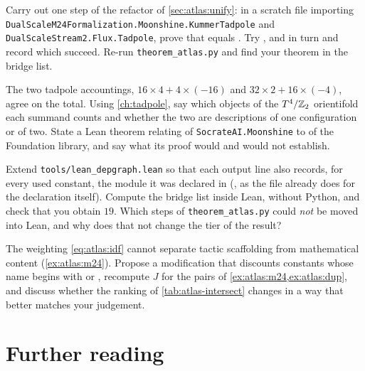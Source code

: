 \begin{exercise}[$\star\star$]\label{ex:atlas:refactor}
Carry out one step of the refactor of \cref{sec:atlas:unify}: in a scratch file importing
\texttt{DualScaleM24Formalization.Moonshine.KummerTadpole} and
\texttt{DualScaleStream2.Flux.Tadpole}, prove that 
equals . Try ,  and
 in turn and record which succeed. Re-run \texttt{theorem\_atlas.py} and
find your theorem in the bridge list.
\end{exercise}

\begin{exercise}[$\star\star$]
The two tadpole accountings, $16\times4+4\times(-16)$ and $32\times2+16\times(-4)$, agree
on the total. Using \cref{ch:tadpole}, say which objects of the $T^4/\mathbb{Z}_2$ orientifold each
summand counts and whether the two are descriptions of one configuration or of two. State
a Lean theorem relating  of \texttt{SocrateAI.Moonshine} to
 of the Foundation library, and say what its proof
would and would not establish.
\end{exercise}

\begin{exercise}[$\star\star\star$]
Extend \texttt{tools/lean\_depgraph.lean} so that each output line also records, for
every used constant, the module it was declared in (, as the
file already does for the declaration itself). Compute the bridge list inside Lean,
without Python, and check that you obtain $19$. Which steps of \texttt{theorem\_atlas.py}
could \emph{not} be moved into Lean, and why does that not change the tier of the result?
\end{exercise}

\begin{exercise}[$\star\star\star$]
The weighting \eqref{eq:atlas:idf} cannot separate tactic scaffolding from mathematical
content (\cref{ex:atlas:m24}). Propose a modification that discounts constants whose
name begins with  or , recompute $J$ for the
pairs of \cref{ex:atlas:m24,ex:atlas:dup}, and discuss whether the ranking of
\cref{tab:atlas-intersect} changes in a way that better matches your judgement.
\end{exercise}

\section*{Further reading}

